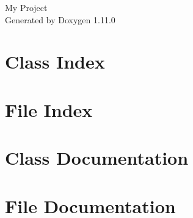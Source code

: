 \documentclass[twoside]{book}
\newcommand{\+}{\discretionary{\mbox{\scriptsize$\hookleftarrow$}}{}{}}
\newcommand{\clearemptydoublepage}{%
    \newpage{\pagestyle{empty}\cleardoublepage}%
  }
\begin{document}
  \raggedbottom
    \hypersetup{pageanchor=false,
                bookmarksnumbered=true,
                pdfencoding=unicode
               }
  \begin{titlepage}
  \vspace*{7cm}
  \begin{center}%
  {\Large My Project}\\
  \vspace*{1cm}
  {\large Generated by Doxygen 1.11.0}\\
  \end{center}
  \end{titlepage}
  \clearemptydoublepage
  \tableofcontents
  \clearemptydoublepage
  \hypersetup{pageanchor=true}
\chapter{Class Index}

\chapter{File Index}

\chapter{Class Documentation}





\chapter{File Documentation}
















  \backmatter
  \newpage
  \clearemptydoublepage
  \printindex
\end{document}
